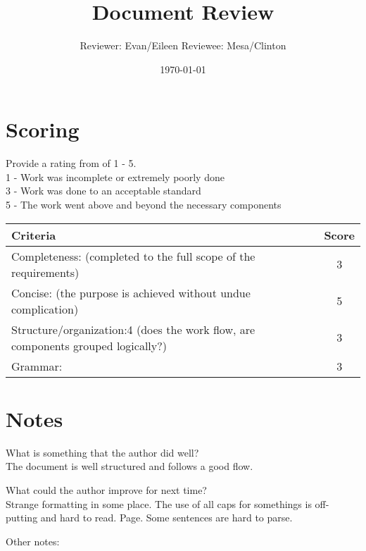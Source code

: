 \documentclass{article}
\title{Document Review}
\author{Reviewer: Evan/Eileen Reviewee: Mesa/Clinton }
\date{\today}
\begin{document}
\maketitle

\section{Scoring}
    Provide a rating from of 1 - 5. \\
    1 - Work was incomplete or extremely poorly done\\
    3 - Work was done to an acceptable standard\\
    5 - The work went above and beyond the necessary components\\

\begin{tabular}{|l|c|}
	\hline
	Criteria & Score\\
	\hline
    Completeness:
    (completed to the full scope of the requirements) & 3\\
	\hline
    Concise:
    (the purpose is achieved without undue complication) & 5 \\
	\hline
    Structure/organization:4
    (does the work flow, are components grouped logically?) &  3\\
    \hline
    Grammar: & 3 \\
    \hline
\end{tabular}

\section{Notes}
    
    What is something that the author did well?\\
    The document is well structured and follows a good flow.
    
    What could the author improve for next time?\\
    Strange formatting in some place.  The use of all caps for somethings is off-putting and hard to read. Page. Some sentences are hard to parse.
    
    Other notes:\\
\end{document}
